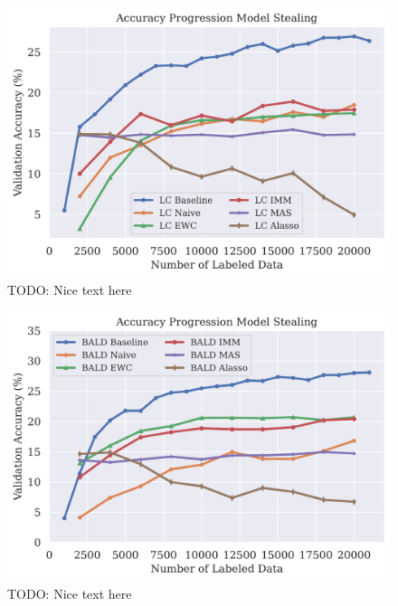 \begin{figure}[h]
    \centering
    \includegraphics[width=0.8\linewidth]{images/results_CALMS/cifar100_softmax_lc.png}
    \caption[Accuracy Comparison for Model Stealing on CIFAR10 using the softmax output and the Active Learning strategy LC]{TODO: Nice text here}
    \label{fig:CALMSCIFAR10SoftmaxLC}
\end{figure}

\begin{figure}[h]
    \centering
    \includegraphics[width=0.8\linewidth]{images/results_CALMS/cifar100_softmax_bald.png}
    \caption[Accuracy Comparison for Model Stealing on CIFAR10 using the softmax output and the Active Learning strategy BALD]{TODO: Nice text here}
    \label{fig:CALMSCIFAR10SoftmaxBALD}
\end{figure}

